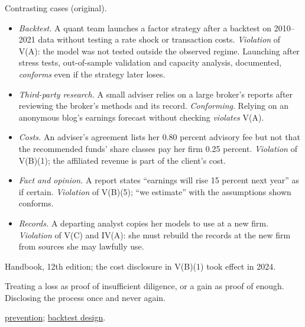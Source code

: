 \begin{qfrule}
 Contrasting cases (original).
\begin{itemize}
\item \emph{Backtest.} A quant team launches a factor strategy after a backtest on 2010--2021 data without testing a rate shock or transaction costs. \emph{Violation} of V(A): the model was not tested outside the observed regime. Launching after stress tests, out-of-sample validation and capacity analysis, documented, \emph{conforms} even if the strategy later loses.
\item \emph{Third-party research.} A small adviser relies on a large broker's reports after reviewing the broker's methods and its record. \emph{Conforming}. Relying on an anonymous blog's earnings forecast without checking \emph{violates} V(A).
\item \emph{Costs.} An adviser's agreement lists her 0.80 percent advisory fee but not that the recommended funds' share classes pay her firm 0.25 percent. \emph{Violation} of V(B)(1); the affiliated revenue is part of the client's cost.
\item \emph{Fact and opinion.} A report states ``earnings will rise 15 percent next year'' as if certain. \emph{Violation} of V(B)(5); ``we estimate'' with the assumptions shown conforms.
\item \emph{Records.} A departing analyst copies her models to use at a new firm. \emph{Violation} of V(C) and IV(A): she must rebuild the records at the new firm from sources she may lawfully use.
\end{itemize}

 Handbook, 12th edition; the cost disclosure in V(B)(1) took effect in 2024.

 Treating a loss as proof of insufficient diligence, or a gain as proof of enough. Disclosing the process once and never again.

 \hyperref[meth:preventing-analysis-violations]{prevention}; \hyperref[meth:backtest-design-evaluation]{backtest design}.

\end{qfrule}

